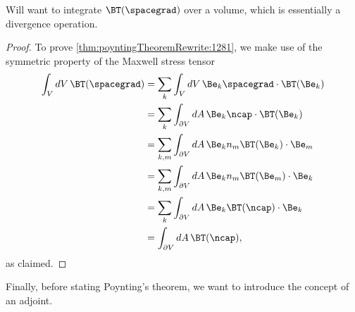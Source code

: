 Will want to integrate \( \BT(\spacegrad) \) over a volume, which is essentially a divergence operation.
\begin{proof}
To prove \cref{thm:poyntingTheoremRewrite:1281}, we make use of the symmetric property of the Maxwell stress tensor
\begin{equation}\label{eqn:poyntingTheoremRewrite:320}
\begin{aligned}
\int_V dV\, \BT(\spacegrad)
&= \sum_k \int_V dV\, \Be_k \spacegrad \cdot \BT(\Be_k) \\
&= \sum_k \int_{\partial V} dA\, \Be_k \ncap \cdot \BT(\Be_k) \\
&= \sum_{k,m} \int_{\partial V} dA\, \Be_k n_m {\BT(\Be_k) \cdot \Be_m} \\
&= \sum_{k,m} \int_{\partial V} dA\, \Be_k n_m {\BT(\Be_m) \cdot \Be_k} \\
&= \sum_{k} \int_{\partial V} dA\, \Be_k {\BT(\ncap) \cdot \Be_k} \\
&= \int_{\partial V} dA\, \BT(\ncap),
\end{aligned}
\end{equation}
as claimed.
\end{proof}

Finally, before stating Poynting's theorem, we want to introduce the concept of an adjoint.

